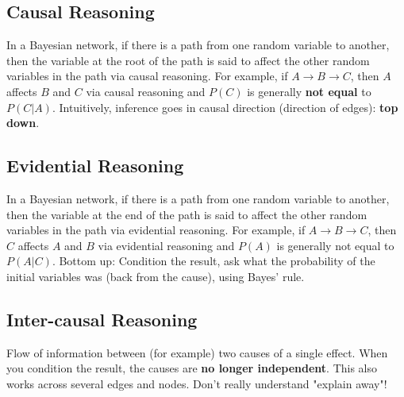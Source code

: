 \subsection{Causal Reasoning}
In a Bayesian network, if there is a path from one random variable to another, then the variable at the root of the path is said to affect the other random variables in the path via causal reasoning. For example, if $A \rightarrow B \rightarrow C$, then $A$ affects $B$ and $C$ via causal reasoning and $P(C)$ is generally \textbf{not equal} to $P(C|A)$.
Intuitively, inference goes in causal direction (direction of edges): \textbf{top down}.

\subsection{Evidential Reasoning}
In a Bayesian network, if there is a path from one random variable to another, then the variable at the end of the path is said to affect the other random variables in the path via evidential reasoning. For example, if $A \rightarrow B \rightarrow C$, then $C$ affects $A$ and $B$ via evidential reasoning and $P(A)$ is generally not equal to $P(A|C)$.
Bottom up: Condition the result, ask what the probability of the initial variables was (back from the cause), using Bayes' rule.

\subsection{Inter-causal Reasoning}
Flow of information between (for example) two causes of a single effect. When you condition the result, the causes are \textbf{no longer independent}. This also works across several edges and nodes. Don't really understand "explain away"! 
